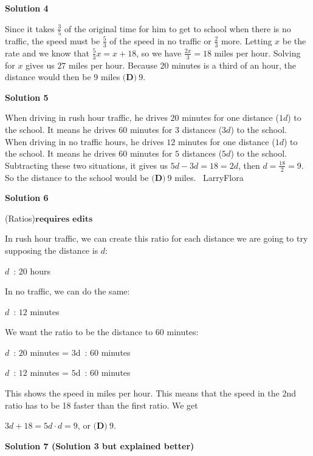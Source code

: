 \begin{enumerate}
 



\textbf{Solution 4}

Since it takes $\frac{3}{5}$ of the original time for him to get to school when there is no traffic, the speed must be $\frac{5}{3}$ of the speed in no traffic or $\frac{2}{3}$ more. Letting $x$ be the rate and we know that $\frac{5}{3}x = x + 18$, so we have $\frac{2x}{3} = 18$ miles per hour. Solving for $x$ gives us $27$ miles per hour. Because $20$ minutes is a third of an hour, the distance would then be $9$ miles $\boxed{\textbf{(D)}~9}$.

 



\textbf{Solution 5}

When driving in rush hour traffic, he drives $20$ minutes for one distance ($1d$) to the school. It means he drives $60$ minutes for $3$ distances ($3d$) to the school. When driving in no traffic hours, he drives $12$ minutes for one distance ($1d$) to the school. It means he drives $60$ minutes for $5$ distances ($5d$) to the school. Subtracting these two situations, it gives us $5d-3d = 18 = 2d$, then $d=\frac{18}{2}=9$. So the distance to the school would be $\boxed{\textbf{(D)}~9}$ miles. ~LarryFlora

 



\textbf{Solution 6}

(Ratios)$\textbf{requires edits}$

 In rush hour traffic, we can create this ratio for each distance we are going to try supposing the distance is $d$:

 $d$ : $20$ hours

 In no traffic, we can do the same:

 $d$ : $12$ minutes

 We want the ratio to be the distance to $60$ minutes:

 $d$ : $20$ minutes = $3$d : $60$ minutes 

 $d$ : $12$ minutes = $5$d : $60$ minutes

 This shows the speed in miles per hour. This means that the speed in the 2nd ratio has to be 18 faster than the first ratio. We get

 $3d+18 = 5d \cdot d=9$, or $\boxed{\textbf{(D)}~9}$.

 



\textbf{Solution 7 (Solution 3 but explained better)}


\end{enumerate}
